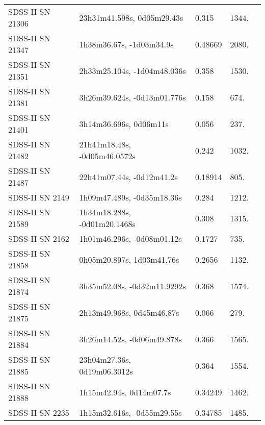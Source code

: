 \begin{longtable}{lllll}
 SDSS-II SN 21306 &     23h31m41.598s, 0d05m29.43s &    0.315 &          1344. &    \citet{2010ApJ...713.1026D} \\
 SDSS-II SN 21347 &       1h38m36.67s, -1d03m34.9s &  0.48669 &          2080. &    \citet{2016SDSSD.C...0000:} \\
 SDSS-II SN 21351 &    2h33m25.104s, -1d04m48.036s &    0.358 &          1530. &    \citet{2011ApJ...738..162S} \\
 SDSS-II SN 21381 &    3h26m39.624s, -0d13m01.776s &    0.158 &           674. &    \citet{2011ApJ...738..162S} \\
 SDSS-II SN 21401 &         3h14m36.696s, 0d06m11s &    0.056 &           237. &    \citet{2011ApJ...738..162S} \\
 SDSS-II SN 21482 &   21h41m18.48s, -0d05m46.0572s &    0.242 &          1032. &    \citet{2011ApJ...738..162S} \\
 SDSS-II SN 21487 &      22h41m07.44s, -0d12m41.2s &  0.18914 &           805. &    \citet{2016SDSSD.C...0000:} \\
  SDSS-II SN 2149 &     1h09m47.489s, -0d35m18.36s &    0.284 &          1212. &    \citet{2011ApJ...738..162S} \\
 SDSS-II SN 21589 &   1h34m18.288s, -0d01m20.1468s &    0.308 &          1315. &    \citet{2011ApJ...738..162S} \\
  SDSS-II SN 2162 &     1h01m46.296s, -0d08m01.12s &   0.1727 &           735. &    \citet{2011ApJ...738..162S} \\
 SDSS-II SN 21858 &      0h05m20.897s, 1d03m41.76s &   0.2656 &          1132. &    \citet{2011ApJ...738..162S} \\
 SDSS-II SN 21874 &    3h35m52.08s, -0d32m11.9292s &    0.368 &          1574. &    \citet{2011ApJ...738..162S} \\
 SDSS-II SN 21875 &      2h13m49.968s, 0d45m46.87s &    0.066 &           279. &    \citet{2011ApJ...738..162S} \\
 SDSS-II SN 21884 &     3h26m14.52s, -0d06m49.878s &    0.366 &          1565. &    \citet{2011ApJ...738..162S} \\
 SDSS-II SN 21885 &    23h04m27.36s, 0d19m06.3012s &    0.364 &          1554. &    \citet{2011ApJ...738..162S} \\
 SDSS-II SN 21888 &        1h15m42.94s, 0d14m07.7s &  0.34249 &          1462. &    \citet{2016SDSSD.C...0000:} \\
  SDSS-II SN 2235 &     1h15m32.616s, -0d55m29.55s &  0.34785 &          1485. &    \citet{2016SDSSD.C...0000:} \\

\end{longtable}
